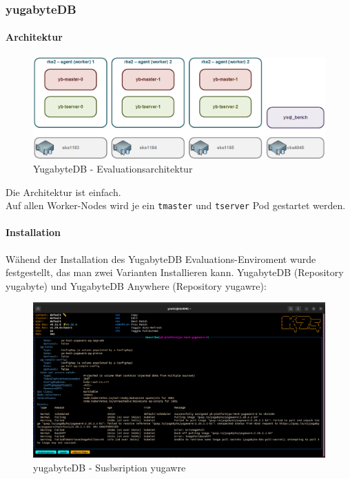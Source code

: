 
\begin{flushleft}
    \subsubsection{yugabyteDB}
    \paragraph{Architektur}
    \begin{figure}[H]
        \centering
        \includegraphics[width=0.8\linewidth]{source/implementation/evaluation/postgresql_ha_solutions/yugabytedb/yugabytedb-evaluation-architecture}
        \caption{YugabyteDB - Evaluationsarchitektur}
        \label{fig:yugabytedb-evaluation-architecture}
    \end{figure}
    Die Architektur ist einfach.\\
    Auf allen Worker-Nodes wird je ein \texttt{tmaster} und \texttt{tserver} Pod gestartet werden.
    \paragraph{Installation}
    Wähend der Installation des YugabyteDB Evaluations-Enviroment wurde festgestellt, das man zwei Varianten Installieren kann.
    YugabyteDB (Repository yugabyte) und YugabyteDB Anywhere (Repository yugawre):
    \begin{figure}[H]
        \centering
        \includegraphics[width=1\linewidth]{source/implementation/evaluation/platforms/yugabytedb_pod_installation_subscription_interrup}
        \caption{yugabyteDB - Susbsription yugawre}
        \label{fig:yugabytedb_pod_installation_subscription_interrup}
    \end{figure}
\end{flushleft}
